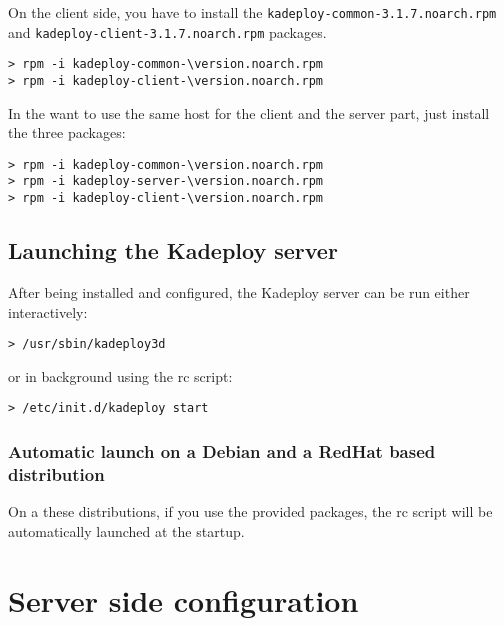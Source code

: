 \documentclass[a4wide,10pt,oneside]{book}
\newcommand{\version}{3.1.7}
\begin{document}
\noindent On the client side, you have to install the \texttt{kadeploy-common-\version.noarch.rpm} and \texttt{kadeploy-client-\version.noarch.rpm} packages.
\begin{small}
\begin{Verbatim}[commandchars=\\\{\}]
> rpm -i kadeploy-common-\version.noarch.rpm
> rpm -i kadeploy-client-\version.noarch.rpm
\end{Verbatim}
\end{small}

\noindent In the want to use the same host for the client and the server part, just install the three packages:
\begin{small}
\begin{Verbatim}[commandchars=\\\{\}]
> rpm -i kadeploy-common-\version.noarch.rpm
> rpm -i kadeploy-server-\version.noarch.rpm
> rpm -i kadeploy-client-\version.noarch.rpm
\end{Verbatim}
\end{small}

\section{Launching the Kadeploy server}
After being installed and configured, the Kadeploy server can be run either interactively:
\begin{small}
\begin{verbatim}
> /usr/sbin/kadeploy3d
\end{verbatim}
\end{small}
\noindent or in background using the rc script:
\begin{small}
\begin{verbatim}
> /etc/init.d/kadeploy start
\end{verbatim}
\end{small}

\subsection{Automatic launch on a Debian and a RedHat based distribution}
\noindent On a these distributions, if you use the provided packages, the rc script will be automatically launched at the startup.

\chapter{Server side configuration}\label{chap:Server_side_conf}
\end{document}
